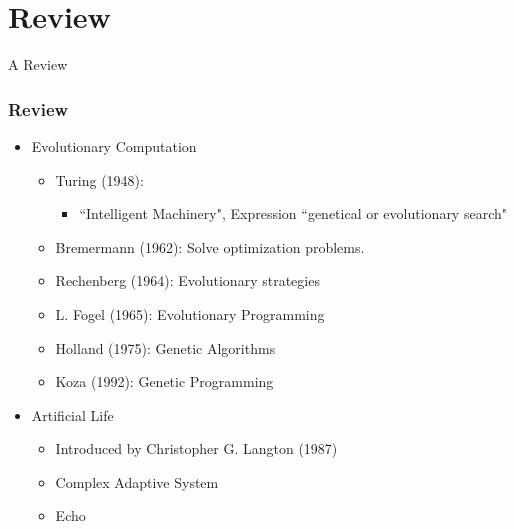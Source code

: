 \section{Review}

\frame
{
	\begin{center}
		\LARGE A Review
	\end{center}
}

\frame
{
	\frametitle{Review}
	
	\begin{itemize}
		\item Evolutionary Computation
			\begin{itemize}
				\item Turing (1948):
					\begin{itemize}
						\item ``Intelligent Machinery", Expression ``genetical or evolutionary search"
					\end{itemize}
				\item Bremermann (1962): Solve optimization problems.
				\item Rechenberg (1964): Evolutionary strategies
				\item L. Fogel (1965): Evolutionary Programming
				\item Holland (1975): Genetic Algorithms
				\item Koza (1992): Genetic Programming				
			\end{itemize}
		\item Artificial Life
			\begin{itemize}
				\item Introduced by Christopher G. Langton (1987)
				\item Complex Adaptive System
				\item Echo
			\end{itemize}
	\end{itemize}
}

